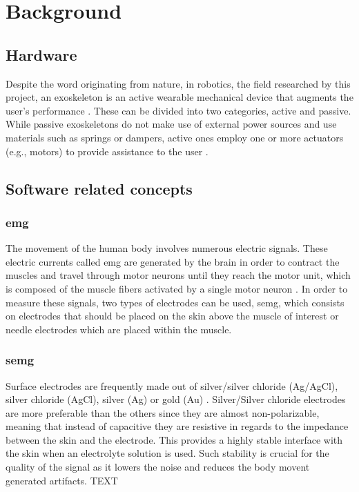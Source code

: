 \section{Background}
\label{section:background}

\subsection{Hardware}

Despite the word originating from nature, in robotics, the field researched by this project, an exoskeleton is an active wearable 
mechanical device that augments the user's performance \cite{exodefinition}. These can be divided into two categories, active and passive. 
While passive exoskeletons do not make use of external power sources and use materials such as springs or dampers, active ones employ 
one or more actuators (e.g., motors) to provide assistance to the user \cite{passiveactiveexo}.


\subsection{Software related concepts}

\subsubsection{\acf{emg}}

The movement of the human body involves numerous electric signals. These electric currents called \ac{emg} are generated by the brain
in order to contract the muscles and travel through motor neurons until they reach the motor unit, which is composed of the muscle fibers
activated by a single motor neuron \cite{emggen}. In order to measure these signals, two types of electrodes can be used, \ac{semg}, 
which consists on electrodes that should be placed on the skin above the muscle of interest or needle electrodes which are placed within 
the muscle. 

\subsubsection{\acf{semg}}

Surface electrodes are frequently made out of silver/silver chloride (Ag/AgCl), silver chloride (AgCl), silver (Ag) or gold (Au) \cite{sEMG}.
Silver/Silver chloride electrodes are more preferable than the others since they are almost non-polarizable, meaning that instead of capacitive
they are resistive in regards to the impedance between the skin and the electrode. This provides a highly stable interface with the skin when 
an electrolyte solution is used. Such stability is crucial for the quality of the signal as it lowers the noise and reduces the body movent generated
artifacts.
TEXT

